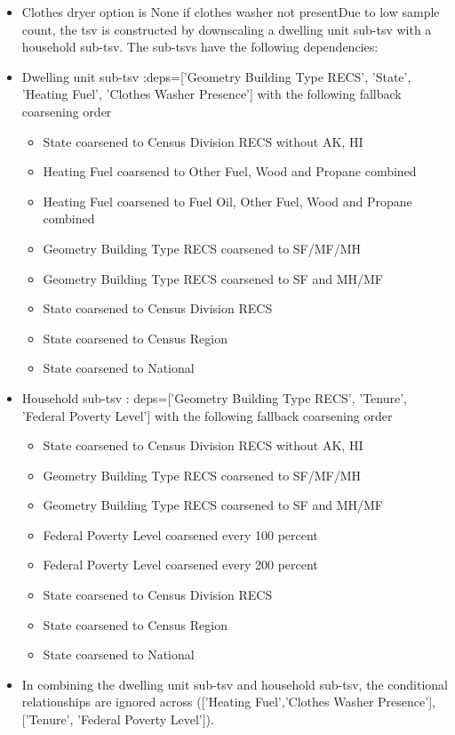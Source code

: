 \begin{itemize}
\item Clothes dryer option is None if clothes washer not presentDue to low sample count, the tsv is constructed by downscaling a dwelling unit sub-tsv with a household sub-tsv. The sub-tsvs have the following dependencies:
\item Dwelling unit sub-tsv :deps=['Geometry Building Type RECS', 'State', 'Heating Fuel', 'Clothes Washer Presence'] with the following fallback coarsening order
  \begin{itemize}
  \item State coarsened to Census Division RECS without AK, HI
  \item Heating Fuel coarsened to Other Fuel, Wood and Propane combined
  \item Heating Fuel coarsened to Fuel Oil, Other Fuel, Wood and Propane combined
  \item Geometry Building Type RECS coarsened to SF/MF/MH
  \item Geometry Building Type RECS coarsened to SF and MH/MF
  \item State coarsened to Census Division RECS
  \item State coarsened to Census Region
  \item State coarsened to National
  \end{itemize}
\item Household sub-tsv : deps=['Geometry Building Type RECS', 'Tenure', 'Federal Poverty Level'] with the following fallback coarsening order
  \begin{itemize}
  \item State coarsened to Census Division RECS without AK, HI
  \item Geometry Building Type RECS coarsened to SF/MF/MH
  \item Geometry Building Type RECS coarsened to SF and MH/MF
  \item Federal Poverty Level coarsened every 100 percent
  \item Federal Poverty Level coarsened every 200 percent
  \item State coarsened to Census Division RECS
  \item State coarsened to Census Region
  \item State coarsened to National
  \end{itemize}
\item In combining the dwelling unit sub-tsv and household sub-tsv, the conditional relationships are ignored across (['Heating Fuel','Clothes Washer Presence'], ['Tenure', 'Federal Poverty Level']).
\end{itemize}

